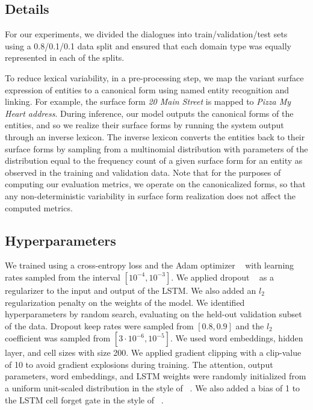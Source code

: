 \documentclass[11pt,a4paper]{article}
\begin{document}
\subsection{Details}
For our experiments, we divided the dialogues into train/validation/test sets using a 0.8/0.1/0.1 data split and ensured that each domain type was equally represented in each of the splits. 

To reduce lexical variability, in a pre-processing step, we map the variant surface expression of entities to a canonical form using named entity recognition and linking. For example, the surface form \emph{20 Main Street} is mapped to \emph{Pizza My Heart address}. During inference, our model outputs the canonical forms of the entities, and so we realize their surface forms by running the system output through an inverse lexicon. The inverse lexicon converts the entities back to their surface forms by sampling from a multinomial distribution with parameters of the distribution equal to the frequency count of a given surface form for an entity as observed in the training and validation data. Note that for the purposes of computing our evaluation metrics, we operate on the canonicalized forms, so that any non-deterministic variability in surface form realization does not affect the computed metrics.


\subsection{Hyperparameters}

We trained using a cross-entropy loss and the Adam optimizer ~\cite{Kingma:15} with learning rates sampled from the interval $[10^{-4}, 10^{-3}]$. We applied dropout ~\cite{Hinton:12} as a regularizer to the input and output of the LSTM. We also added an $l_2$ regularization penalty on the weights of the model. We identified hyperparameters by random search, evaluating on the held-out validation subset of the data. Dropout keep rates were sampled from $[0.8, 0.9]$ and the $l_2$ coefficient was sampled from $[3\cdot 10^{-6},10^{-5}]$. We used word embeddings, hidden layer, and cell sizes with size 200.  We applied gradient clipping with a clip-value of 10 to avoid gradient explosions during training.
The attention, output parameters, word embeddings, and LSTM weights were randomly initialized from a uniform unit-scaled distribution in the style of ~\cite{Sussillo:15}. We also added a bias of 1 to the LSTM cell forget gate in the style of ~\cite{Pham:14}. 
\end{document}
